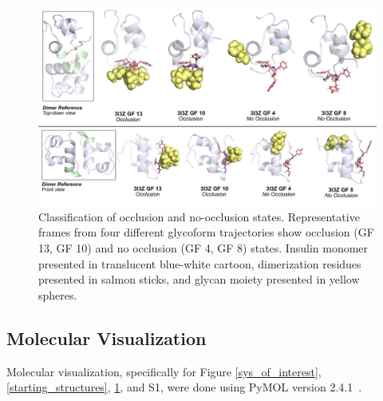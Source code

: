 \documentclass[9pt]{elife}
\begin{document}
\begin{figure}[H]
\centering
\includegraphics[width=\textwidth]{Figures/Fig_dimer_occlusion.png}
\caption{Classification of occlusion and no-occlusion states. Representative frames from four different glycoform trajectories show occlusion (GF 13, GF 10) and no occlusion (GF 4, GF 8) states. Insulin monomer presented in translucent blue-white cartoon, dimerization residues presented in salmon sticks, and glycan moiety presented in yellow spheres.}
\label{occlusion}
\end{figure}

\subsection{Molecular Visualization}
Molecular visualization, specifically for Figure \ref{sys_of_interest}, \ref{starting_structures}, \ref{occlusion}, and S1, were done using PyMOL version 2.4.1~\cite{delano2002pymol}.
\end{document}
